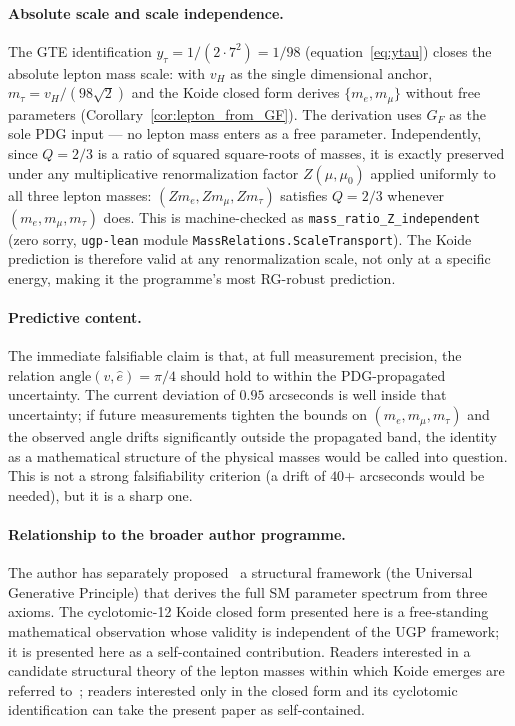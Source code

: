 \documentclass[11pt]{article}
\theoremstyle{remark}
\begin{document}
\paragraph{Absolute scale and scale independence.}
The GTE identification $y_\tau = 1/(2 \cdot 7^2) = 1/98$ (equation~\eqref{eq:ytau}) closes the absolute lepton mass scale: with $v_H$ as the single dimensional anchor, $m_\tau = v_H/(98\sqrt{2})$ and the Koide closed form derives $\{m_e, m_\mu\}$ without free parameters (Corollary~\ref{cor:lepton_from_GF}).  The derivation uses $G_F$ as the sole PDG input — no lepton mass enters as a free parameter.
Independently, since $Q = 2/3$ is a ratio of squared square-roots of masses, it is exactly preserved under any multiplicative renormalization factor $Z(\mu,\mu_0)$ applied uniformly to all three lepton masses: $(Z m_e, Z m_\mu, Z m_\tau)$ satisfies $Q=2/3$ whenever $(m_e,m_\mu,m_\tau)$ does.  This is machine-checked as \texttt{mass\_ratio\_Z\_independent} (zero sorry, \texttt{ugp-lean} module \texttt{MassRelations.ScaleTransport}).  The Koide prediction is therefore valid at any renormalization scale, not only at a specific energy, making it the programme's most RG-robust prediction.

\paragraph{Predictive content.}
The immediate falsifiable claim is that, at full measurement precision, the relation $\mathrm{angle}(v, \hat{e}) = \pi/4$ should hold to within the PDG-propagated uncertainty.  The current deviation of $0.95$ arcseconds is well inside that uncertainty; if future measurements tighten the bounds on $(m_e, m_\mu, m_\tau)$ and the observed angle drifts significantly outside the propagated band, the identity as a mathematical structure of the physical masses would be called into question.  This is not a strong falsifiability criterion (a drift of $40$+ arcseconds would be needed), but it is a sharp one.

\paragraph{Relationship to the broader author programme.}
The author has separately proposed~\cite{Spivack2026_SM_UGP} a structural framework (the Universal Generative Principle) that derives the full SM parameter spectrum from three axioms.  The cyclotomic-12 Koide closed form presented here is a free-standing mathematical observation whose validity is independent of the UGP framework; it is presented here as a self-contained contribution. Readers interested in a candidate structural theory of the lepton masses within which Koide emerges are referred to~\cite{Spivack2026_SM_UGP}; readers interested only in the closed form and its cyclotomic identification can take the present paper as self-contained.
\end{document}
